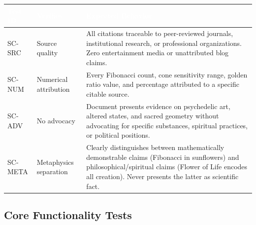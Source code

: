 \documentclass[11pt,letterpaper]{article}
\newcommand{\tableheader}[1]{\textbf{\sffamily\textcolor{white}{#1}}}
\begin{document}
\begin{center}
\begin{tabularx}{\textwidth}{L{1.5cm}L{3cm}X}
\toprule
{}
\tableheader{Test ID} & \tableheader{Verifies} & \tableheader{Expected Behavior} \\
\midrule
SC-SRC & Source quality & All citations traceable to peer-reviewed journals, institutional research, or professional organizations. Zero entertainment media or unattributed blog claims. \\
SC-NUM & Numerical attribution & Every Fibonacci count, cone sensitivity range, golden ratio value, and percentage attributed to a specific citable source. \\
SC-ADV & No advocacy & Document presents evidence on psychedelic art, altered states, and sacred geometry without advocating for specific substances, spiritual practices, or political positions. \\
SC-META & Metaphysics separation & Clearly distinguishes between mathematically demonstrable claims (Fibonacci in sunflowers) and philosophical/spiritual claims (Flower of Life encodes all creation). Never presents the latter as scientific fact. \\
\bottomrule
\end{tabularx}
\end{center}

\subsection{Core Functionality Tests}
\end{document}
